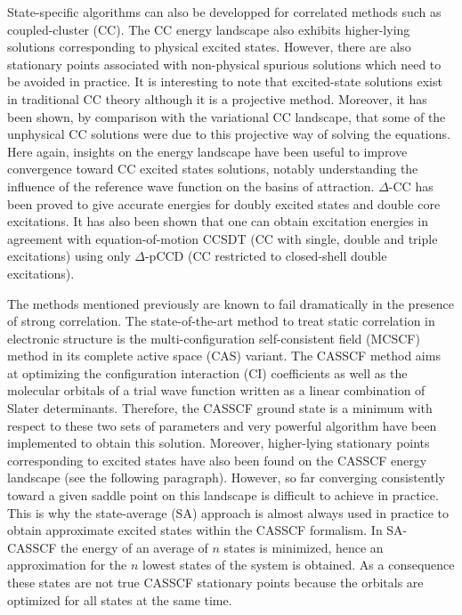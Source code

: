 \documentclass[aip,jcp,reprint,noshowkeys,superscriptaddress]{revtex4-1}
\begin{document}
State-specific algorithms can also be developped for correlated methods such as coupled-cluster (CC). \cite{Shavitt_2009}
The CC energy landscape also exhibits higher-lying solutions corresponding to physical excited states. \cite{Jankowski_1994,Jankowski_1994a,Piecuch_2000,Mayhall_2010,Lee_2019,Kossoski_2021}
However, there are also stationary points associated with non-physical spurious solutions which need to be avoided in practice. \cite{Jankowski_1994,Jankowski_1994a,Piecuch_2000,Mayhall_2010,Kossoski_2021,Marie_2021a}
It is interesting to note that excited-state solutions exist in traditional CC theory although it is a projective method.
Moreover, it has been shown, by comparison with the variational CC landscape, that some of the unphysical CC solutions were due to this projective way of solving the equations. \cite{Marie_2021}
Here again, insights on the energy landscape have been useful to improve convergence toward CC excited states solutions, notably understanding the influence of the reference wave function on the basins of attraction. \cite{Jankowski_1995,Lee_2019,Marie_2021a}
$\Delta$-CC has been proved to give accurate energies for doubly excited states and double core excitations. \cite{Lee_2019}
It has also been shown that one can obtain excitation energies in agreement with equation-of-motion CCSDT (CC with single, double and triple excitations) using only $\Delta$-pCCD (CC restricted to closed-shell double excitations). \cite{Kossoski_2021}

The methods mentioned previously are known to fail dramatically in the presence of strong correlation. \cite{Jensen_2017}
The state-of-the-art method to treat static correlation in electronic structure is the multi-configuration self-consistent field (MCSCF) method in its complete active space (CAS) variant. \cite{Roos_2016}
The CASSCF method aims at optimizing the configuration interaction (CI) coefficients as well as the molecular orbitals of a trial wave function written as a linear combination of Slater determinants. \cite{Helgaker_2000,Roos_2016}
Therefore, the CASSCF ground state is a minimum with respect to these two sets of parameters and very powerful algorithm have been implemented to obtain this solution. \cite{Roos_1980,Werner_1985,Sun_2017,Kreplin_2019,Kreplin_2020}
Moreover, higher-lying stationary points corresponding to excited states have also been found on the CASSCF energy landscape (see the following paragraph).
However, so far converging consistently toward a given saddle point on this landscape is difficult to achieve in practice.
This is why the state-average (SA) approach is almost always used in practice to obtain approximate excited states within the CASSCF formalism.
In SA-CASSCF the energy of an average of $n$ states is minimized, hence an approximation for the $n$ lowest states of the system is obtained.
As a consequence these states are not true CASSCF stationary points because the orbitals are optimized for all states at the same time.
\end{document}
